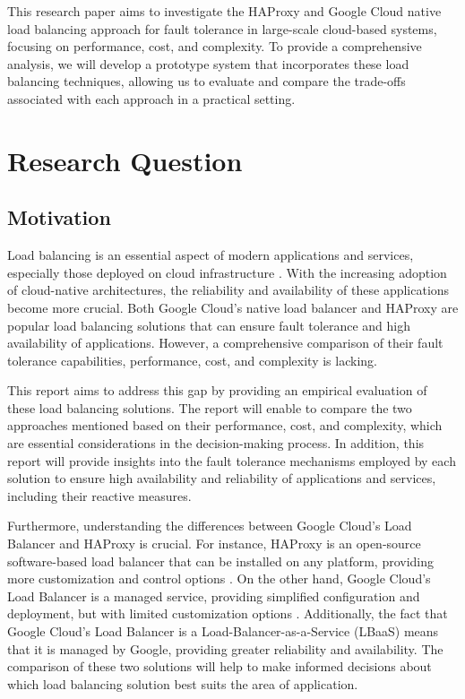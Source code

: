 \documentclass[lettersize,journal]{IEEEtran}
\begin{document}
\noindent This research paper aims to investigate the HAProxy and Google Cloud native load balancing approach for fault tolerance in large-scale cloud-based systems, focusing on performance, cost, and complexity. To provide a comprehensive analysis, we will develop a prototype system that incorporates these load balancing techniques, allowing us to evaluate and compare the trade-offs associated with each approach in a practical setting.

\section{Research Question}

\subsection{Motivation}
\noindent 
Load balancing is an essential aspect of modern applications and services, especially those deployed on cloud infrastructure \cite{load_balancing}. With the increasing adoption of cloud-native architectures, the reliability and availability of these applications become more crucial. Both Google Cloud's native load balancer \cite{gce_load_balancer} and HAProxy \cite{haproxy} are popular load balancing solutions that can ensure fault tolerance and high availability of applications. However, a comprehensive comparison of their fault tolerance capabilities, performance, cost, and complexity is lacking.

This report aims to address this gap by providing an empirical evaluation of these load balancing solutions. The report will enable to compare the two approaches mentioned based on their performance, cost, and complexity, which are essential considerations in the decision-making process. In addition, this report will provide insights into the fault tolerance mechanisms employed by each solution to ensure high availability and reliability of applications and services, including their reactive measures.

Furthermore, understanding the differences between Google Cloud's Load Balancer and HAProxy is crucial. For instance, HAProxy is an open-source software-based load balancer that can be installed on any platform, providing more customization and control options \cite{about_HAProxy}. On the other hand, Google Cloud's Load Balancer is a managed service, providing simplified configuration and deployment, but with limited customization options \cite{about_Cloud_Load_Balancing}. Additionally, the fact that Google Cloud's Load Balancer is a Load-Balancer-as-a-Service (LBaaS) means that it is managed by Google, providing greater reliability and availability. The comparison of these two solutions will help to make informed decisions about which load balancing solution best suits the area of application.
\end{document}
